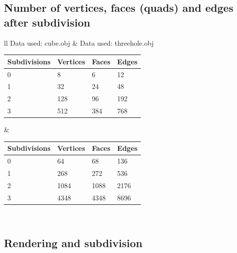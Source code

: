 \documentclass[12pt,a4paper]{scrartcl}
\begin{document}
\subsection{Number of vertices, faces (quads) and edges after subdivision}
\begin{table}[h]
	\begin{tabular}{ll}
		Data used: cube.obj & Data used: threehole.obj \\
		\begin{tabular}{|l|l|l|l|}
			\hline
			Subdivisions & Vertices & Faces & Edges \\
			\hline
			0 & 8 & 6 & 12 \\
			\hline
			1 & 32 & 24 & 48 \\
			\hline
			2 & 128 & 96 & 192 \\
			\hline
			3 & 512 & 384 & 768 \\
			\hline
		\end{tabular}
		&
		\begin{tabular}{|l|l|l|l|}
			\hline
			Subdivisions & Vertices & Faces & Edges \\
			\hline
			0 & 64 & 68 & 136 \\
			\hline
			1 & 268 & 272 & 536 \\
			\hline
			2 & 1084 & 1088 & 2176 \\
			\hline
			3 & 4348 & 4348 & 8696 \\
			\hline
		\end{tabular}
		\\
	\end{tabular}
\end{table}

\subsection{Rendering and subdivision}
\end{document}
